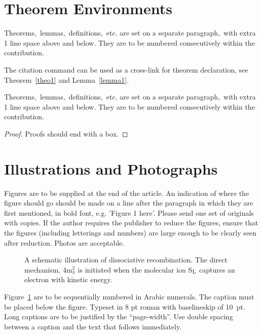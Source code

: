 \documentclass{IJCS_template}
\begin{document}
\section{Theorem Environments}

\begin{theorem}
\label{theo1}
Theorems$,$ lemmas$,$ definitions$,$ etc. are set on a separate
paragraph$,$ with extra 1 line space above and below. They are to be
numbered consecutively within the contribution.
\end{theorem}

The citation command can be used as a cross-link for theorem
declaration, see Theorem~\ref{theo1} and Lemma~\ref{lemma1}.

\begin{lemma}
\label{lemma1}
Theorems$,$ lemmas$,$ definitions$,$ etc. are set on a separate
paragraph$,$ with extra 1 line space above and below. They are to be
numbered consecutively within the contribution.
\end{lemma}

\begin{proof}
Proofs should end with a box.
\end{proof}

\section{Illustrations and Photographs}
Figures are to be supplied at the end of the article. An indication
of where the figure should go should be made on a line after the
paragraph in which they are first mentioned, in bold font, e.g.
'Figure 1 here'.  Please send one set of originals with copies. If
the author requires the publisher to reduce the figures, ensure that
the figures (including letterings and numbers) are large enough to
be clearly seen after reduction. Photos are acceptable.

\begin{figure}[th]
\centerline{}
\vspace*{8pt}
\caption{A schematic illustration of dissociative recombination. The
direct mechanism, 4m$^2_\pi$ is initiated when the molecular ion
S$_{\rm L}$ captures an electron with kinetic energy.\label{one}}
\end{figure}

Figure~\ref{one} are to be sequentially numbered in Arabic
numerals. The caption must be placed below the figure. Typeset in 8 pt
roman with baselineskip of 10~pt. Long captions are to be justified by
the ``page-width''.  Use double spacing between a caption and the text
that follows immediately.
\end{document}
